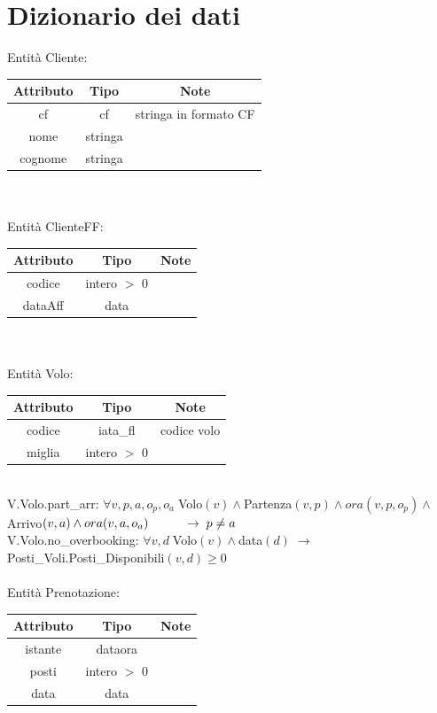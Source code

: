 \documentclass[a4paper,12pt]{report}
\begin{document}
  \chapter{Dizionario dei dati}
    Entità Cliente: \\
      \begin{tabular}{|c|c|c|}
        \hline Attributo & Tipo & Note \\
        \hline cf & cf & stringa in formato CF \\
        \hline nome & stringa & \\
        \hline cognome & stringa & \\
        \hline
      \end{tabular} \\ \\
    Entità ClienteFF: \\
      \begin{tabular}{|c|c|c|}
        \hline Attributo & Tipo & Note \\
        \hline codice & intero $>$ 0 & \\
        \hline dataAff & data & \\
        \hline
      \end{tabular} \\ \\
      Entità Volo: \\
      \begin{tabular}{|c|c|c|}
        \hline Attributo & Tipo & Note \\
        \hline codice & iata\_fl & codice volo \\
        \hline miglia & intero $>$ 0 & \\
        \hline
      \end{tabular} \\
      V.Volo.part\_arr: $\forall v, p, a, o_p, o_a \; $Volo$(v) \wedge $Partenza$(v, p) \wedge ora(v, p, o_p) \wedge $Arrivo$(v, a) \wedge ora(v, a, o_a) \\
      \hspace*{1cm}\rightarrow\; p \neq a$ \\
      V.Volo.no\_overbooking: $\forall v, d \; $Volo$(v) \wedge $data$(d) \;\rightarrow\; $Posti\_Voli.Posti\_Disponibili$(v, d) \geq 0$ \\ \\
      Entità Prenotazione: \\
      \begin{tabular}{|c|c|c|}
        \hline Attributo & Tipo & Note \\
        \hline istante & dataora & \\
        \hline posti & intero $>$ 0 & \\
        \hline data & data & \\
        \hline
      \end{tabular} \\ \\
\end{document}
